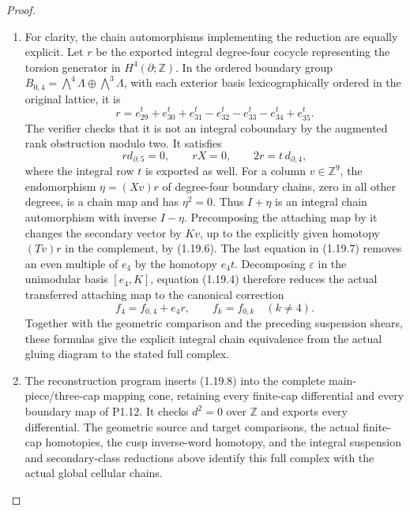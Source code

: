 \begin{proof}
\begin{enumerate}[label=\arabic*.]
\item For clarity, the chain automorphisms implementing the reduction
are equally explicit.  Let $r$ be the exported integral degree-four
cocycle representing the torsion generator in $H^4(\partial;\mathbb Z)$.
In the ordered boundary group
$B_{0,4}=\bigwedge^4\Lambda\oplus\bigwedge^3\Lambda$, with each
exterior basis lexicographically ordered in the original lattice,
it is
\[
r=e_{29}^{t}+e_{30}^{t}+e_{31}^{t}
  -e_{32}^{t}-e_{33}^{t}-e_{34}^{t}+e_{35}^{t}.
\]
The verifier checks that it is not an integral coboundary by the
augmented rank obstruction modulo two.  It satisfies
\[
 r d_{\partial,5}=0,\qquad rX=0,
 \qquad 2r=t\,d_{\partial,4},
\tag{1.19.7}
\]
where the integral row $t$ is exported as well.
For a column $v\in\mathbb Z^9$, the endomorphism
$\eta=(Xv)r$ of degree-four boundary chains, zero in all other
degrees, is a chain map and has $\eta^2=0$.
Thus $I+\eta$ is an integral chain automorphism with inverse
$I-\eta$. Precomposing the attaching map by it changes the
secondary vector by $Kv$, up to the explicitly given homotopy
$(Tv)r$ in the complement, by (1.19.6).
The last equation in (1.19.7) removes an even multiple of $e_4$
by the homotopy $e_4t$.  Decomposing $\varepsilon$ in the
unimodular basis $[e_4,K]$, equation (1.19.4) therefore reduces
the actual transferred attaching map to the canonical correction
\[
 f_4=f_{0,4}+e_4r,
 \qquad f_k=f_{0,k}\quad(k\ne4).
\tag{1.19.8}
\]
Together with the geometric comparison and the preceding suspension
shears, these formulas give the explicit integral chain equivalence
from the actual gluing diagram to the stated full complex.

\item The reconstruction program inserts (1.19.8) into the complete
main-piece/three-cap mapping cone, retaining every finite-cap
differential and every boundary map of P1.12.  It checks $d^2=0$
over $\mathbb Z$ and exports every differential. The geometric
source and target comparisons, the actual finite-cap homotopies,
the cusp inverse-word homotopy, and the integral suspension and
secondary-class reductions above identify this full complex with
the actual global cellular chains.


\end{enumerate}
\end{proof}
